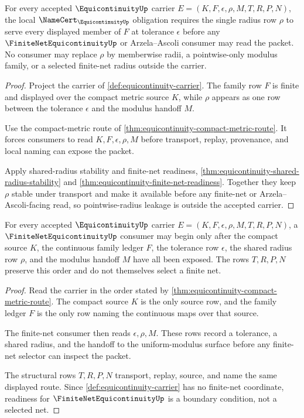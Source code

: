 \begin{theorem}
\label{thm:equicontinuity-shared-radius-obligation}
For every accepted $\EquicontinuityUp$ carrier $E=(K,F,\epsilon,\rho,M,T,R,P,N)$, the local $\NameCert_{\EquicontinuityUp}$ obligation requires the single radius row $\rho$ to serve every displayed member of $F$ at tolerance $\epsilon$ before any $\FiniteNetEquicontinuityUp$ or Arzela--Ascoli consumer may read the packet. No consumer may replace $\rho$ by memberwise radii, a pointwise-only modulus family, or a selected finite-net radius outside the carrier.
\end{theorem}
\begin{proof}
Project the carrier of \autoref{def:equicontinuity-carrier}. The family row $F$ is finite and displayed over the compact metric source $K$, while $\rho$ appears as one row between the tolerance $\epsilon$ and the modulus handoff $M$.

Use the compact-metric route of \autoref{thm:equicontinuity-compact-metric-route}. It forces consumers to read $K,F,\epsilon,\rho,M$ before transport, replay, provenance, and local naming can expose the packet.

Apply shared-radius stability and finite-net readiness, \autoref{thm:equicontinuity-shared-radius-stability} and \autoref{thm:equicontinuity-finite-net-readiness}. Together they keep $\rho$ stable under transport and make it available before any finite-net or Arzela--Ascoli-facing read, so pointwise-radius leakage is outside the accepted carrier.
\end{proof}

\begin{theorem}
\label{thm:equicontinuity-finite-net-readiness}
For every accepted $\EquicontinuityUp$ carrier $E=(K,F,\epsilon,\rho,M,T,R,P,N)$, a $\FiniteNetEquicontinuityUp$ consumer may begin only after the compact source $K$, the continuous family ledger $F$, the tolerance row $\epsilon$, the shared radius row $\rho$, and the modulus handoff $M$ have all been exposed. The rows $T,R,P,N$ preserve this order and do not themselves select a finite net.
\end{theorem}
\begin{proof}
Read the carrier in the order stated by \autoref{thm:equicontinuity-compact-metric-route}. The compact source $K$ is the only source row, and the family ledger $F$ is the only row naming the continuous maps over that source.

The finite-net consumer then reads $\epsilon,\rho,M$. These rows record a tolerance, a shared radius, and the handoff to the uniform-modulus surface before any finite-net selector can inspect the packet.

The structural rows $T,R,P,N$ transport, replay, source, and name the same displayed route. Since \autoref{def:equicontinuity-carrier} has no finite-net coordinate, readiness for $\FiniteNetEquicontinuityUp$ is a boundary condition, not a selected net.
\end{proof}

